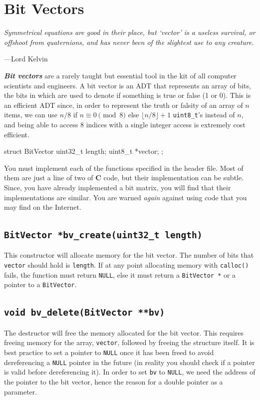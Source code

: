 \documentclass{article}
\begin{document}
\section{Bit Vectors}

\epigraph{\emph{Symmetrical equations are good in their place, but `vector'
is a useless survival, or offshoot from quaternions, and has never been of the
slightest use to any creature.}}{---Lord Kelvin}

\noindent \textit{\textbf{Bit vectors}} are a rarely taught but
essential tool in the kit of all computer scientists and engineers. A
bit vector is an ADT that represents an array of bits, the bits in which
are used to denote if something is true or false (1 or 0). This is an
efficient ADT since, in order to represent the truth or falsity of an
array of $n$ items, we can use $n / 8$ if $n \equiv 0 \pmod 8$ else
$\lfloor n / 8 \rfloor + 1$ \texttt{uint8\_t}'s instead of $n$, and
being able to access $8$ indices with a single integer access is
extremely cost efficient.

\begin{codelisting}{}
struct BitVector {
  uint32_t length;
  uint8_t *vector;
};
\end{codelisting}

You must implement each of the functions specified in the header file. Most of
them are just a line of two of \textbf{C} code, but their implementation can be
subtle. Since, you have already implemented a bit matrix, you will find
that their implementations are similar. You are warned \emph{again}
against using code that you may find on the Internet.

\subsection{\texttt{BitVector *bv\_create(uint32\_t length)}}

This constructor will allocate memory for the bit vector.  The number of
bits that \texttt{vector} should hold is \texttt{length}.  If at any
point allocating memory with \texttt{calloc()} fails, the function must
return \texttt{NULL}, else it must return a \texttt{BitVector *} or a
pointer to a \texttt{BitVector}.

\subsection{\texttt{void bv\_delete(BitVector **bv)}}

The destructor will free the memory allocated for the bit vector. This
requires freeing memory for the array, \texttt{vector}, followed by
freeing the structure itself. It is best practice to set a pointer to
\texttt{NULL} once it has been freed to avoid dereferencing a
\texttt{NULL} pointer in the future (in reality you should check if a
pointer is valid before dereferencing it). In order to set \texttt{bv}
to \texttt{NULL}, we need the address of the pointer to the
bit vector, hence the reason for a double pointer as a parameter.
\end{document}
